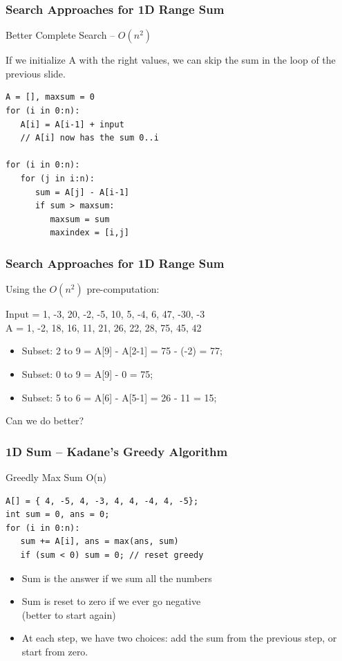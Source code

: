 \documentclass{beamer}
\begin{document}
\begin{frame}[fragile]
  \frametitle{Search Approaches for 1D Range Sum}
  \begin{block}{Better Complete Search -- $O(n^2)$}

    If we initialize A with the right values, we can skip the sum in
    the loop of the previous slide.

{\smaller
\begin{verbatim}
A = [], maxsum = 0
for (i in 0:n):
   A[i] = A[i-1] + input
   // A[i] now has the sum 0..i

for (i in 0:n):
   for (j in i:n):
      sum = A[j] - A[i-1]
      if sum > maxsum:
         maxsum = sum
         maxindex = [i,j]
\end{verbatim}
}
  \end{block}
\end{frame}

\begin{frame}
  \frametitle{Search Approaches for 1D Range Sum}
  Using the $O(n^2)$ pre-computation:

  \bigskip

  \begin{center}
    Input = 1, -3, 20, -2, -5, 10, 5, -4, 6, 47, -30, -3\\
    A = 1, -2, 18, 16, 11, 21, 26, 22, 28, 75, 45, 42\\
  \end{center}

  \bigskip

  \begin{itemize}
  \item Subset: 2 to 9 = A[9] - A[2-1] = 75 - (-2) = 77;
  \item Subset: 0 to 9 = A[9] - 0 = 75;
  \item Subset: 5 to 6 = A[6] - A[5-1] = 26 - 11 = 15;
  \end{itemize}

  \bigskip

  Can we do better?

\end{frame}

\begin{frame}[fragile]
  \frametitle{1D Sum -- Kadane's Greedy Algorithm}
  \begin{block}{Greedly Max Sum O(n)}
      {\smaller
\begin{verbatim}
A[] = { 4, -5, 4, -3, 4, 4, -4, 4, -5};
int sum = 0, ans = 0;
for (i in 0:n):
   sum += A[i], ans = max(ans, sum)
   if (sum < 0) sum = 0; // reset greedy
\end{verbatim}
      }
  \end{block}

\begin{itemize}
\item Sum is the answer if we sum all the numbers
\item Sum is reset to zero if we ever go negative\\
  (better to start again)
\item At each step, we have two choices: add the sum from the previous
  step, or start from zero.
\end{itemize}
\end{frame}
\end{document}
